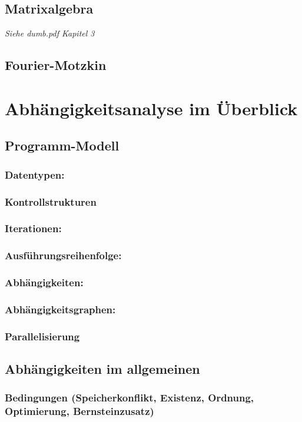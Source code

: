 \documentclass[a4paper,10pt]{scrartcl}
\begin{document}
\subsection{Matrixalgebra}
\textit{Siehe dumb.pdf Kapitel 3}
\subsection{Fourier-Motzkin}

\section{Abhängigkeitsanalyse im Überblick}
\subsection{Programm-Modell}
\subsubsection{Datentypen:}
\subsubsection{Kontrollstrukturen}
\subsubsection{Iterationen:}
\subsubsection{Ausführungsreihenfolge:}
\subsubsection{Abhängigkeiten:}
\subsubsection{Abhängigkeitsgraphen:}
\subsubsection{Parallelisierung}
\subsection{Abhängigkeiten im allgemeinen}
\subsubsection{Bedingungen (Speicherkonflikt, Existenz, Ordnung, Optimierung, Bernsteinzusatz)}
\end{document}
